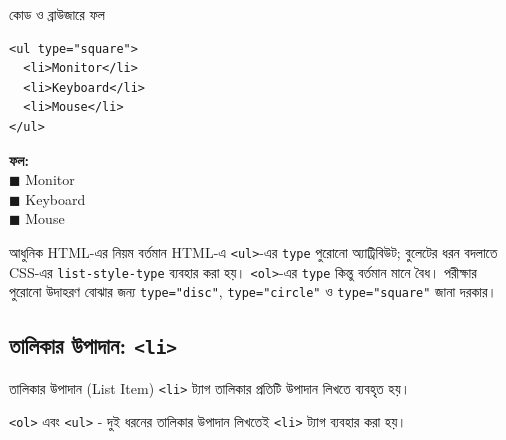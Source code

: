 \begin{chFourWholeExample}{কোড ও ব্রাউজারে ফল}
\noindent
\begin{minipage}[t]{.50\linewidth}\vspace{0pt}

\begin{verbatim}
<ul type="square">
  <li>Monitor</li>
  <li>Keyboard</li>
  <li>Mouse</li>
</ul>
\end{verbatim}

\end{minipage}\hfill
\begin{minipage}[t]{.46\linewidth}\vspace{0pt}
\textbf{ফল:}\\
\(\blacksquare\) Monitor\\
\(\blacksquare\) Keyboard\\
\(\blacksquare\) Mouse\\
\end{minipage}
\end{chFourWholeExample}

\begin{mistakebox}{আধুনিক HTML-এর নিয়ম}
বর্তমান HTML-এ \texttt{<ul>}-এর \texttt{type} পুরোনো অ্যাট্রিবিউট; বুলেটের ধরন বদলাতে CSS-এর \texttt{list-style-type} ব্যবহার করা হয়। \texttt{<ol>}-এর \texttt{type} কিন্তু বর্তমান মানে বৈধ। পরীক্ষার পুরোনো উদাহরণ বোঝার জন্য \texttt{type="disc"}, \texttt{type="circle"} ও \texttt{type="square"} জানা দরকার।
\end{mistakebox}



\subsection{তালিকার উপাদান: \texttt{<li>}}

\begin{definitionbox}{তালিকার উপাদান (List Item)}
\texttt{<li>} ট্যাগ তালিকার প্রতিটি উপাদান লিখতে ব্যবহৃত হয়।
\end{definitionbox}

\texttt{<ol>} এবং \texttt{<ul>} - দুই ধরনের তালিকার উপাদান লিখতেই \texttt{<li>} ট্যাগ ব্যবহার করা হয়।


